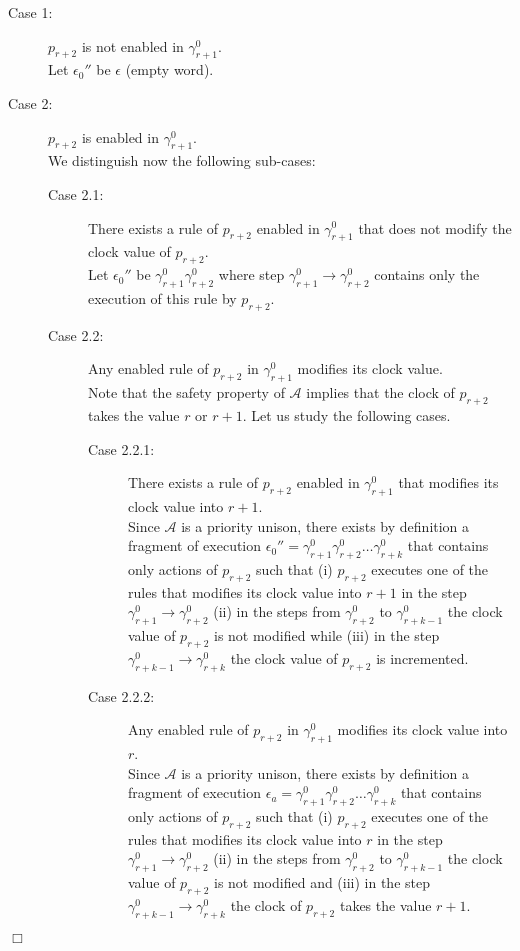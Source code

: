 \documentclass[11pt,english,letterpaper]{article}
\newenvironment{proof}{{\noindent\bf Proof. } }{{\hfill $\Box$}}
\begin{document}
\begin{proof}
\begin{description}
\item[Case 1:] $p_{r+2}$ is not enabled in $\gamma^{0}_{r+1}$.\\
Let $\epsilon_{0}''$ be $\epsilon$ (empty word).
\item[Case 2:] $p_{r+2}$ is enabled in $\gamma^{0}_{r+1}$.\\
We distinguish now the following sub-cases:
\begin{description}
\item[Case 2.1:] There exists a rule of $p_{r+2}$ enabled in $\gamma^{0}_{r+1}$ that does not modify the clock value of $p_{r+2}$.\\
Let $\epsilon_{0}''$ be $\gamma^{0}_{r+1}\gamma^{0}_{r+2}$ where step $\gamma^{0}_{r+1}\rightarrow\gamma^{0}_{r+2}$ contains only the execution of this rule by $p_{r+2}$.
\item[Case 2.2:] Any enabled rule of $p_{r+2}$ in $\gamma^{0}_{r+1}$ modifies its clock value.\\
Note that the safety property of $\mathcal{A}$ implies that the clock of $p_{r+2}$ takes the value $r$ or $r+1$. Let us study the following cases.
\begin{description}
\item[Case 2.2.1:]  There exists a rule of $p_{r+2}$ enabled in $\gamma^{0}_{r+1}$ that modifies its clock value into $r+1$.\\
Since $\mathcal{A}$ is a priority unison, there exists by definition a fragment of execution $\epsilon_{0}''=\gamma^{0}_{r+1}\gamma^{0}_{r+2}\ldots\gamma^{0}_{r+k}$  that contains only actions of $p_{r+2}$ such that (i) $p_{r+2}$ executes one of the rules that modifies its clock value into $r+1$ in the step $\gamma^{0}_{r+1}\rightarrow\gamma^{0}_{r+2}$ (ii) in the steps from $\gamma^{0}_{r+2}$ to $\gamma^{0}_{r+k-1}$ the clock value of $p_{r+2}$ is not modified while (iii) in the step	$\gamma^{0}_{r+k-1}\rightarrow\gamma^{0}_{r+k}$ the clock value of $p_{r+2}$ is incremented.
\item[Case 2.2.2:]  Any enabled rule of $p_{r+2}$ in $\gamma^{0}_{r+1}$ modifies its clock value into $r$.\\
Since $\mathcal{A}$ is a priority unison, there exists by definition a fragment of execution $\epsilon_{a}=\gamma^{0}_{r+1}\gamma^{0}_{r+2}\ldots\gamma^{0}_{r+k}$ that contains only actions of $p_{r+2}$ such that (i) $p_{r+2}$ executes one of the rules that modifies its clock value into $r$ in the step $\gamma^{0}_{r+1}\rightarrow\gamma^{0}_{r+2}$ (ii) in the steps from $\gamma^{0}_{r+2}$ to $\gamma^{0}_{r+k-1}$ the clock value of $p_{r+2}$ is not modified and (iii) in the step	$\gamma^{0}_{r+k-1}\rightarrow\gamma^{0}_{r+k}$ the clock of $p_{r+2}$ takes the value $r+1$. 	
	

\end{description}
\end{description}
\end{description}
\end{proof}
\end{document}
